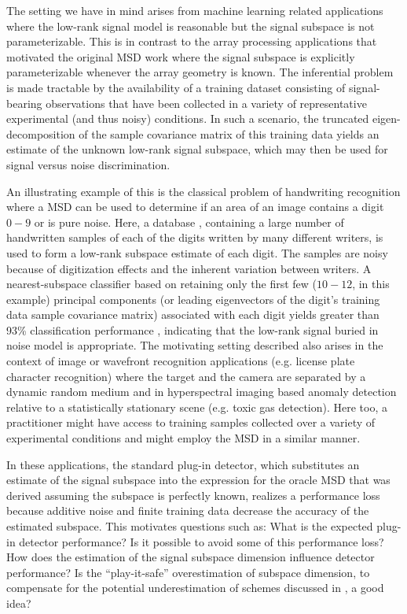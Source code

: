 The setting we have in mind arises from machine learning related applications where the low-rank signal model is reasonable but the signal subspace is not parameterizable. This is in contrast to the array processing applications that motivated the original MSD work \cite{scharf1994matched} where the signal subspace is explicitly parameterizable whenever the array geometry is known. The inferential problem is made tractable by the availability of a training dataset consisting of signal-bearing observations that have been collected in a variety of representative experimental (and thus noisy) conditions. In such a scenario,  the truncated eigen-decomposition of the sample covariance matrix of this training data yields an estimate of the unknown low-rank signal subspace, which may then be used for signal versus noise discrimination.

An illustrating example of this is the classical problem of handwriting recognition \cite[Chapter 10]{elden2007matrix} where a MSD can be used to determine if an area of an image contains a digit $0-9$ or is pure noise. Here, a database \cite{hwritingurl}, containing a large number of handwritten samples of each of the digits written by many different writers, is used to form a low-rank subspace estimate of each digit. The samples are noisy because of digitization effects and the inherent variation between writers. A nearest-subspace classifier based on retaining only the first few ($10-12$, in this example) principal components (or leading eigenvectors of the digit's training data sample covariance matrix) associated with each digit yields greater than 93\% classification performance \cite[Table 10.1, pp. 121]{elden2007matrix}, indicating that the low-rank signal buried in noise model is appropriate. The motivating setting described also arises in the context of image or wavefront recognition applications (e.g. license plate character recognition) where the target and the camera are separated by a dynamic random medium and in hyperspectral imaging based anomaly detection  \cite{thai2002invariant,healey1999models,kwon2006kernel} relative to a statistically stationary scene (e.g. toxic gas detection). Here too, a practitioner might have access to training samples collected over a variety of experimental conditions and might employ the MSD in a similar manner.

In these applications, the standard plug-in detector, which substitutes an estimate of the signal subspace into the expression for the oracle MSD that was derived assuming the subspace is perfectly known, realizes a performance loss because additive noise and finite training data decrease the accuracy of the estimated subspace. This motivates questions such as: What is the expected plug-in detector performance? Is it possible to avoid some of this performance loss? How does the estimation of the signal subspace dimension influence detector  performance? Is the ``play-it-safe''  overestimation of subspace dimension, to compensate for the potential underestimation of schemes discussed in \cite{nadakuditi2008sample} , a good idea? 

